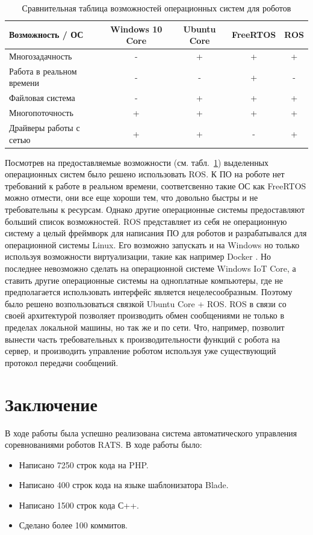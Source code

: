 \documentclass[a4paper,12pt]{article}
\begin{document}
\begin{table}[H]
    \centering
    \begin{tabular}{|p{4cm}|c|c|c|c|}
    \hline
    Возможность / ОС & Windows 10 Core & Ubuntu Core & FreeRTOS & ROS \\
    \hline
    Многозадачность & - & + & + & + \\
    \hline
    Работа в реальном времени & - & - & + & - \\
    \hline
    Файловая система  & - & + & + & + \\
    \hline
    Многопоточность & + & + & + & + \\
    \hline
    Драйверы работы с сетью & + & + & - & + \\
    \hline
    \end{tabular}
    \caption{Сравнительная таблица возможностей операционных систем для роботов}
    \label{tab:os_summarize}
\end{table}

Посмотрев на предоставляемые возможности (см. табл.~\ref{tab:os_summarize}) выделенных операционных систем было решено использовать ROS. К ПО на роботе нет требований к работе в реальном времени, соответсвенно такие ОС как FreeRTOS можно отмести, они все еще хороши тем, что довольно быстры и не требовательны к ресурсам. Однако другие операционные системы предоставляют больший список возможностей. ROS представляет из себя не операционную систему а целый фреймворк для написания ПО для роботов и разрабатывался для операционной системы Linux. Его возможно запускать и на Windows но только используя возможности виртуализации, такие как например Docker \cite{web:docker}. Но последнее невозможно сделать на операционной системе Windows IoT Core, а ставить другие операционные системы на одноплатные компьютеры, где не предполагается использовать интерфейс является нецелесообразным. Поэтому было решено возпользоваться связкой Ubuntu Core + ROS. ROS в связи со своей архитектурой позволяет производить обмен сообщениями не только в пределах локальной машины, но так же и по сети. Что, например, позволит вынести часть требовательных к производительности функций с робота на сервер, и производить управление роботом используя уже существующий протокол передачи сообщений.

\section{Заключение}
В ходе работы была успешно реализована система автоматического управления соревнованиями роботов RATS.
В ходе работы было:
\begin{itemize}
    \item Написано 7250 строк кода на PHP.
    \item Написано 400 строк кода на языке шаблонизатора Blade.
    \item Написано 1500 строк кода С++.
    \item Сделано более 100 коммитов.
\end{itemize}

\newpage
 
 
\end{document}
